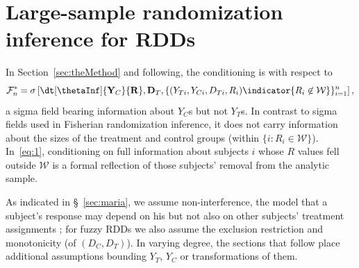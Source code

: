\section{Large-sample randomization inference for RDDs} \label{sec:large-sample-rand}

In Section~\ref{sec:theMethod} and following, the conditioning is with respect to
\begin{equation} \label{eq:1}
\mathcal{F}^*_{n}=\sigma\left[ \dt[\thetaInf]{\mathbf{Y}_{C}}{
    \mathbf{R}},
\mathbf{D}_{T},  \{(Y_{Ti},
Y_{Ci}, D_{Ti}, R_{i})\indicator{{R}_{i} \not\in
  \mathcal{W}}\}_{i=1}^{n}\right],
\end{equation}
a sigma field bearing
information about $Y_C$s but not $Y_T$s. In contrast to sigma fields 
used in Fisherian randomization inference, it does not carry
information about the sizes of the treatment and control groups
(within $\{i : R_{i} \in \mathcal{W}\}$).
In~\eqref{eq:1}, conditioning on full information about subjects $i$
whose $R$ values fell outside $\mathcal{W}$ is a formal reflection of
those subjects' removal from the analytic sample.

As indicated in \S~\ref{sec:maria}, 
we assume non-interference, the model that
a subject's response may depend on his but not also on other subjects'
treatment assignments \citep{cox:1958,rubin:1978}; for fuzzy RDDs we also
assume the exclusion restriction
and monotonicity (of $(D_{C}, D_{T})$).  In varying degree, the
sections that follow place additional assumptions bounding $Y_{T}$,
$Y_{C}$ or transformations of them.



